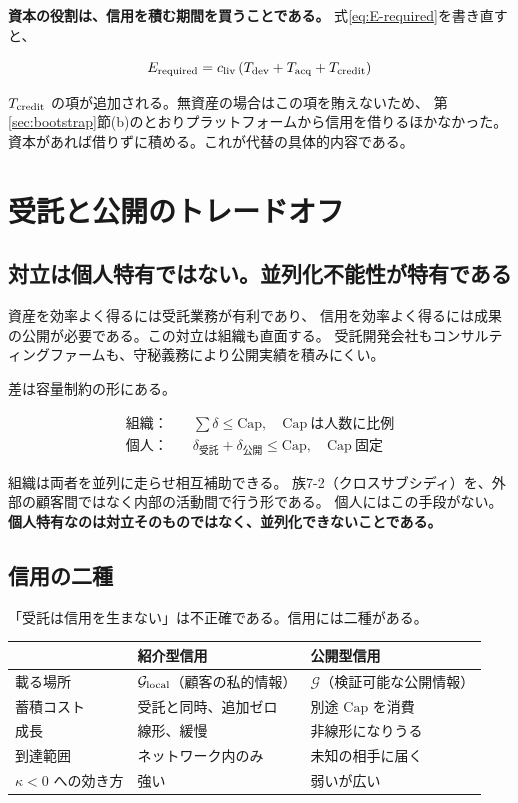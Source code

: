 \textbf{資本の役割は、信用を積む期間を買うことである。}
式\eqref{eq:E-required}を書き直すと、

\begin{equation}
E_{\rm required} = c_{\rm liv}\,(T_{\rm dev} + T_{\rm acq} + T_{\rm credit})
\label{eq:E-required-2}
\end{equation}

$T_{\rm credit}$ の項が追加される。無資産の場合はこの項を賄えないため、
第\ref{sec:bootstrap}節(b)のとおりプラットフォームから信用を借りるほかなかった。
資本があれば借りずに積める。これが代替の具体的内容である。

\section{受託と公開のトレードオフ}

\subsection{対立は個人特有ではない。並列化不能性が特有である}

資産を効率よく得るには受託業務が有利であり、
信用を効率よく得るには成果の公開が必要である。この対立は組織も直面する。
受託開発会社もコンサルティングファームも、守秘義務により公開実績を積みにくい。

差は容量制約の形にある。

\begin{align}
\text{組織：}\quad & \sum\delta \leq \mathrm{Cap}, \quad \mathrm{Cap}\ \text{は人数に比例} \\
\text{個人：}\quad & \delta_{\text{受託}} + \delta_{\text{公開}} \leq \mathrm{Cap}, \quad \mathrm{Cap}\ \text{固定}
\end{align}

組織は両者を並列に走らせ相互補助できる。
族7-2（クロスサブシディ）を、外部の顧客間ではなく内部の活動間で行う形である。
個人にはこの手段がない。\textbf{個人特有なのは対立そのものではなく、並列化できないことである。}

\subsection{信用の二種}

「受託は信用を生まない」は不正確である。信用には二種がある。

\begin{center}
\begin{tabularx}{\textwidth}{@{}lXX@{}}
\toprule
 & 紹介型信用 & 公開型信用 \\
\midrule
載る場所 & $\mathcal{G}_{\rm local}$（顧客の私的情報） & $\mathcal{G}$（検証可能な公開情報） \\
蓄積コスト & 受託と同時、追加ゼロ & 別途 $\mathrm{Cap}$ を消費 \\
成長 & 線形、緩慢 & 非線形になりうる \\
到達範囲 & ネットワーク内のみ & 未知の相手に届く \\
$\kappa<0$ への効き方 & 強い & 弱いが広い \\
\bottomrule
\end{tabularx}
\label{tab:solo-credit-types}
\end{center}


